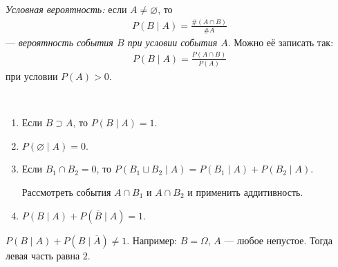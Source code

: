 \documentclass[../main.tex]{subfiles}
\begin{document}
\begin{df}
 \textit{Условная вероятность:} если $A \neq \varnothing$, то
 \begin{align*}
  P(B \mid A) = \frac{\# (A \cap B)}{\# A}
 \end{align*} --- \textit{вероятность события $B$ при условии события $A$}. Можно её записать так:
 \begin{align*}
  P(B \mid A) = \frac{P(A \cap B)}{P(A)}
 \end{align*} при условии $P(A) > 0$.
\end{df}
\begin{prop*}\
 \begin{enumerate}
  \item Если $B \supset A$, то $P(B \mid A) = 1$.
  \item $P(\varnothing \mid A) = 0$.
  \item Если $B_1 \cap B_2 = 0$, то $P(B_1 \sqcup B_2 \mid A) = P(B_1 \mid A) + P(B_2 \mid A) $.

   Рассмотреть события $A \cap B_1$ и $A \cap B_2$ и применить аддитивность.
  \item $P(B \mid A) + P(\overline B \mid A) = 1$.
 \end{enumerate} 
 \begin{remrk*}
  $P(B \mid A) + P(B \mid \overline A) \neq 1$. Например: $B = \Omega$, $A$ --- любое непустое. Тогда левая часть равна $2$.
 \end{remrk*}
\end{prop*}
\end{document}
